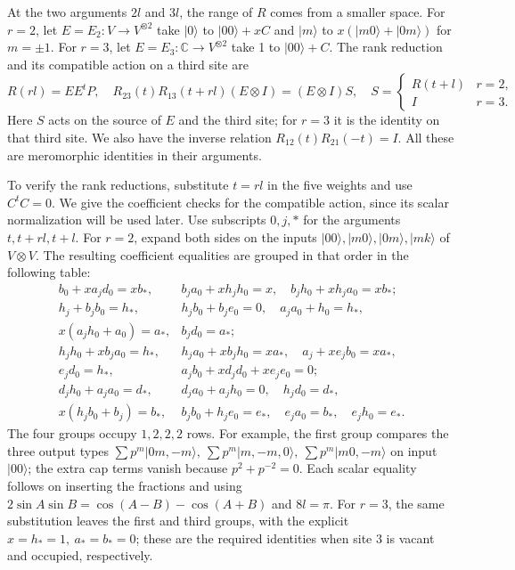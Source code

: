At the two arguments \(2l\) and \(3l\), the range of \(R\) comes from a smaller space. For \(r=2\), let \(E=E_2:V\to V^{\otimes 2}\) take \(|0\rangle\) to \(|00\rangle+xC\) and \(|m\rangle\) to \(x(|m0\rangle+|0m\rangle)\) for \(m=\pm1\). For \(r=3\), let \(E=E_3:\mathbb C\to V^{\otimes 2}\) take 1 to \(|00\rangle+C\). The rank reduction and its compatible action on a third site are
\[
 R(rl)=EE^t P,\quad
 R_{23}(t)R_{13}(t+rl)(E\otimes I)=(E\otimes I)S,\quad S=
 \begin{cases}R(t+l)&r=2,\\I&r=3.\end{cases}
\]
Here \(S\) acts on the source of \(E\) and the third site; for \(r=3\) it is the identity on that third site. We also have the inverse relation \(R_{12}(t)R_{21}(-t)=I\). All these are meromorphic identities in their arguments.

To verify the rank reductions, substitute \(t=rl\) in the five weights and use \(C^t C=0\). We give the coefficient checks for the compatible action, since its scalar normalization will be used later. Use subscripts \(0,j,*\) for the arguments \(t,t+rl,t+l\). For \(r=2\), expand both sides on the inputs \(|00\rangle,|m0\rangle,|0m\rangle,|mk\rangle\) of \(V\otimes V\). The resulting coefficient equalities are grouped in that order in the following table:
\[
\begin{array}{ll}
 b_0+x a_jd_0=x b_*,& b_j a_0+x h_j h_0=x,\quad b_j h_0+x h_j a_0=x b_*;\\
 h_j+b_j b_0=h_*,&h_j b_0+b_j e_0=0,\quad a_j a_0+h_0=h_*,\\
 x(a_jh_0+a_0)=a_*,&b_j d_0=a_*;\\
 h_j h_0+x b_j a_0=h_*,& h_j a_0+x b_j h_0=x a_*,\quad a_j+x e_j b_0=x a_*,\\
 e_j d_0=h_*,& a_j b_0+x d_j d_0+x e_j e_0=0;\\
 d_j h_0+a_j a_0=d_*,&d_j a_0+a_j h_0=0,\quad h_j d_0=d_*,\\
 x(h_j b_0+b_j)=b_*,& b_j b_0+h_j e_0=e_*,\quad e_j a_0=b_*,\quad e_j h_0=e_* .
\end{array}
\]
The four groups occupy \(1,2,2,2\) rows. For example, the first group compares the three output types \(\sum p^m|0m,-m\rangle,\ \sum p^m|m,-m,0\rangle,\ \sum p^m|m0,-m\rangle\) on input \(|00\rangle\); the extra cap terms vanish because \(p^2+p^{-2}=0\). Each scalar equality follows on inserting the fractions and using \(2\sin A\sin B=\cos(A-B)-\cos(A+B)\) and \(8l=\pi\). For \(r=3\), the same substitution leaves the first and third groups, with the explicit \(x=h_*=1,\ a_*=b_*=0\); these are the required identities when site 3 is vacant and occupied, respectively.

